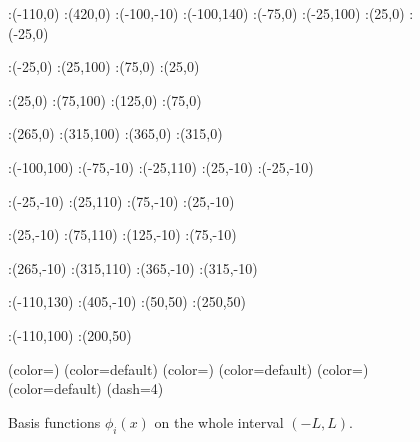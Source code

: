 \begin{figure}[h]
\figinit{0.7pt}
:(-110,0) :(420,0)
:(-100,-10) :(-100,140)
:(-75,0) :(-25,100) 
:(25,0) :(-25,0)

:(-25,0) :(25,100) 
:(75,0) :(25,0)

:(25,0) :(75,100) 
:(125,0) :(75,0)

:(265,0) :(315,100) 
:(365,0) :(315,0)

:(-100,100)
%
:(-75,-10) :(-25,110) 
:(25,-10) :(-25,-10)

:(-25,-10) :(25,110) 
:(75,-10) :(25,-10)

:(25,-10) :(75,110) 
:(125,-10) :(75,-10)

:(265,-10) :(315,110) 
:(365,-10) :(315,-10)

:(-110,130) :(405,-10)
:(50,50) :(250,50)

:(-110,100) :(200,50)

\figdrawbegin{}
\figdrawarrow[1,2]
\figdrawline[3,4]
\figdrawline[4,5]
\figset (color=\Redrgb)
\figdrawline[31,41]
\figdrawline[41,51]
\figset (color=default)
\figset (color=\ForestGreenrgb)
\figdrawline[32,42]
\figdrawline[42,52]
\figset (color=default)
\figset (color=\Bluergb)
\figdrawline[33,43]
\figdrawline[43,53]
\figset (color=default)
\figset(dash=4)
\figdrawline[4,6]
\figdrawline[200,4]
\figdrawline[41,61]
\figdrawline[42,62]
\figdrawline[43,63]
\figdrawarrow[11,12]

\figdrawend

\centerline{\box\figBoxA}
\caption{Basis functions $\phi_i(x)$ on the whole interval $(-L,L)$.}\label{basis_int}
\end{figure}

